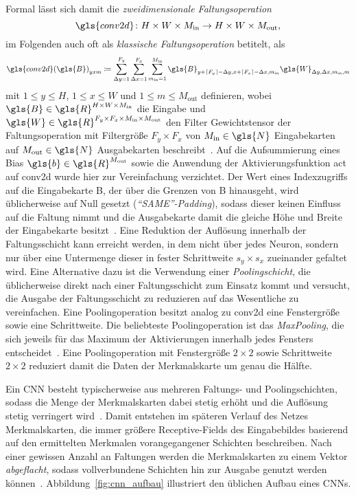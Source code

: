 Formal lässt sich damit die \emph{zweidimensionale Faltungsoperation}
\begin{equation*}
  \gls{conv2d} \colon H \times W \times M_{\mathrm{in}} \to H \times W \times M_{\mathrm{out}},
\end{equation*}
im Folgenden auch oft als \emph{klassische Faltungsoperation} betitelt, als
\begin{equation*}
  {\gls{conv2d}\left(\gls{B}\right)}_{yxm} \coloneqq \sum_{\Delta y = 1}^{F_y} \sum_{\Delta x = 1}^{F_x} \sum_{m_{\mathrm{in}} = 1}^{M_\mathrm{in}} \gls{B}_{y + \left\lceil F_y \right\rceil - \Delta y, x + \left\lceil F_x \right\rceil - \Delta x, m_{\mathrm{in}}} \gls{W}_{\Delta y, \Delta x, m_{\mathrm{in}}, m}
\end{equation*}
mit $1 \leq y \leq H$, $1 \leq x \leq W$ und $1 \leq m \leq M_{\mathrm{out}}$ definieren, wobei $\gls{B} \in \gls{R}^{H \times W \times M_{\mathrm{in}}}$ die Eingabe und $\gls{W} \in \gls{R}^{F_y \times F_x \times M_{\mathrm{in}} \times M_{\mathrm{out}}}$ den Filter \bzw{} Gewichtstensor der Faltungsoperation mit Filtergröße $F_y \times F_x$ von $M_{\mathrm{in}} \in \gls{N}$ Eingabekarten auf $M_{\mathrm{out}} \in \gls{N}$ Ausgabekarten beschreibt~\cite{tensorflow}.
Auf die Aufsummierung eines Bias $\gls{b} \in \gls{R}^{M_{\mathrm{out}}}$ sowie die Anwendung der Aktivierungsfunktion \gls{act} auf \gls{conv2d} wurde hier zur Vereinfachung verzichtet.
Der Wert eines Indexzugriffs auf die Eingabekarte \gls{B}, der über die Grenzen von \gls{B} hinausgeht, wird üblicherweise auf Null gesetzt (\emph{\enquote{SAME}-Padding}), sodass dieser keinen Einfluss auf die Faltung nimmt und die Ausgabekarte damit die gleiche Höhe und Breite der Eingabekarte besitzt~\cite{tensorflow}.
Eine Reduktion der Auflösung innerhalb der Faltungsschicht kann erreicht werden, in dem nicht über jedes Neuron, sondern nur über eine Untermenge dieser in fester Schrittweite $s_y \times s_x$ zueinander gefaltet wird.
Eine Alternative dazu ist die Verwendung einer \emph{Poo\-ling\-sch\-icht}, die üblicherweise direkt nach einer Faltungsschicht zum Einsatz kommt und versucht, die Ausgabe der Faltungsschicht zu reduzieren \bzw{} auf das Wesentliche zu vereinfachen.
Eine Poolingoperation besitzt analog zu \gls{conv2d} eine Fenstergröße sowie eine Schrittweite.
Die beliebteste Poolingoperation ist das \emph{MaxPooling}, die sich jeweils für das Maximum der Aktivierungen innerhalb jedes Fensters entscheidet~\cite{Nielsen}.
Eine Poolingoperation mit Fenstergröße $2 \times 2$ sowie Schrittweite $2 \times 2$ reduziert damit die Daten der Merkmalskarte um genau die Hälfte.

Ein \gls{CNN} besteht typischerweise aus mehreren Faltungs- und Poolingschichten, sodass die Menge der Merkmalskarten dabei stetig erhöht und die Auflösung stetig verringert wird~\cite{Nielsen}.
Damit entstehen im späteren Verlauf des Netzes Merkmalskarten, die immer größere Receptive-Fields des Eingabebildes basierend auf den ermittelten Merkmalen vorangegangener Schichten beschreiben.
Nach einer gewissen Anzahl an Faltungen werden die Merkmalskarten zu einem Vektor \emph{abgeflacht}, sodass vollverbundene Schichten hin zur Ausgabe genutzt werden können~\cite{Nielsen}.
Abbildung~\ref{fig:cnn_aufbau} illustriert den üblichen Aufbau eines \glspl{CNN}.

